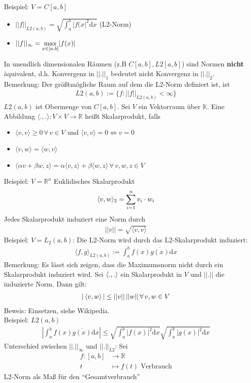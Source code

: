 Beispiel: $V=C[a,b]$
\begin{itemize}
  \item $||f||_{L2(a,b)} = \sqrt{\int_a^b |f(x|^2 \mathrm{d}x}$ (L2-Norm)
  \item $||f||_{\infty} = \underset{x \in [a, b]}{\max} |f(x)|$
\end{itemize}
In unendlich dimensionalen Räumen (z.B $C[a,b], L2[a,b]$) sind Normen
\large{\textcolor{rot}{\textbf{nicht}}} äquivalent, d.h. Konvergenz 
in $||.||_1$ bedeutet nicht Konvergenz in $||.||_2$.\\
Bemerkung: Der größtmögliche Raum auf dem die L2-Norm definiert ist, ist
\begin{align*}
  L2(a,b) := \{f:||f||_{L2(a,b)} < \infty\}
\end{align*}
$L2(a,b)$ ist Obermenge von $C[a,b]$.
 Sei $V$ ein Vektorraum über $\mathbb{K}$. Eine Abbildung $\langle.,.\rangle:V \times V \rightarrow \mathbb{R}$
heißt Skalarprodukt, falls
\begin{itemize}
  \item $\langle v,v\rangle \geq 0\, \forall\, v \in V$ und $\langle v,v\rangle=0 \Leftrightarrow v=0$
  \item $\langle v,w\rangle = \overline{\langle w,v \rangle}$
  \item $\langle \alpha v + \beta w, z\rangle = \alpha \langle v,z \rangle + \beta \langle w, z \rangle\, \forall\,v,w,z\in V$
\end{itemize}
Beispiel: $V=\mathbb{R}^n$ Euklidisches Skalarprodukt
\begin{align*}
  \langle v,w \rangle_2 = \sum\limits_{i=1}^{n}{v}_i \cdot w_i
\end{align*}
 Jedes Skalarprodukt induziert eine Norm durch
\begin{align*}
  ||v||=\sqrt{\langle v, v \rangle}
\end{align*}
Beispiel: $V=L_2(a,b)$: Die L2-Norm wird durch das L2-Skalarprodukt induziert:
\begin{align*}
  \langle f, g \rangle_{L2(a,b)} := \int_a^b f(x) \overline{g(x)} \mathrm{d}x
\end{align*}
Bemerkung: Es lässt sich zeigen, dass die Maximumsnorm
nicht durch ein Skalarprodukt induziert wird.
 Sei $\left\langle ., . \right\rangle$ ein Skalarprodukt in $V$
und $||.||$ die induzierte Norm. Dann gilt:
\begin{align*}
  |\left\langle v, w \right\rangle| \leq ||v||\,||w||\, \forall\, v,w \in V
\end{align*}
Beweis: Einsetzen, siehe Wikipedia.\\
Beispiel: $L2(a,b)$
\begin{align*}
  |\int_a^b f(x)\overline{g(x)}\mathrm{d}x| \leq \sqrt{\int_a^b |f(x)|^2 \mathrm{d}x}\sqrt{\int_a^b |g(x)|^2 \mathrm{d}x}
\end{align*}
Unterschied zwischen $||.||_{\infty}$ und $||.||_{L2}$: Sei
\begin{align*}
  f:[a,b] & \longrightarrow \mathbb{R} \\
  t &\mapsto f(t) \text{ Verbrauch}
\end{align*}
L2-Norm als Maß für den ``Gesamtverbrauch''
